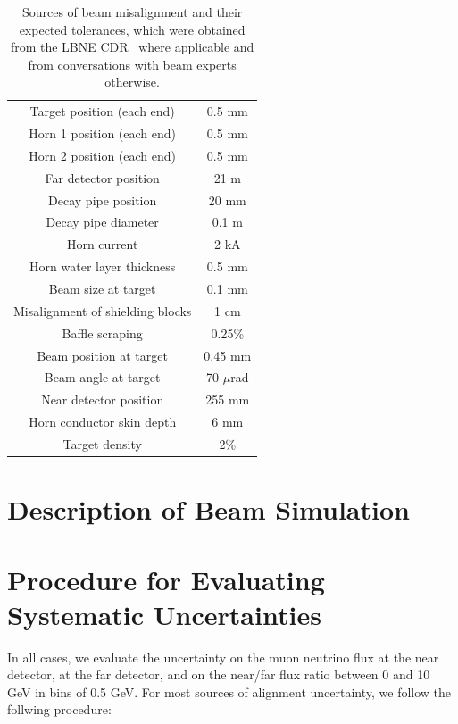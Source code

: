 \begin{table}
\centering
\begin{tabular}{ | c | c | }
\hline
  Target position (each end) & 0.5 mm \\
  Horn 1 position (each end) & 0.5 mm \\
  Horn 2 position (each end) & 0.5 mm \\
  Far detector position & 21 m \\
  Decay pipe position & 20 mm \\
  Decay pipe diameter & 0.1 m \\
  Horn current & 2 kA \\
  Horn water layer thickness & 0.5 mm \\
  Beam size at target & 0.1 mm \\
  Misalignment of shielding blocks & 1 cm \\
  Baffle scraping & 0.25\% \\
  Beam position at target & 0.45 mm \\
  Beam angle at target & 70 $\mu$rad \\
  Near detector position & 255 mm \\
  Horn conductor skin depth & 6 mm \\
  Target density & 2\% \\ 
\hline
\end{tabular}
\caption{Sources of beam misalignment and their expected tolerances, which were obtained from the LBNE CDR~\cite{lbnecdr} where applicable and from conversations with beam experts otherwise.}
\label{tab:syslist}
\end{table}

\section{Description of Beam Simulation}
\label{sec:beamsim}

\section{Procedure for Evaluating Systematic Uncertainties}
\label{sec:procedure}

In all cases, we evaluate the uncertainty on the muon neutrino flux at the near detector, at the far detector, and on the near/far flux ratio between 0 and 10 GeV in bins of 0.5 GeV.  For most sources of alignment uncertainty, we follow the follwing procedure:

